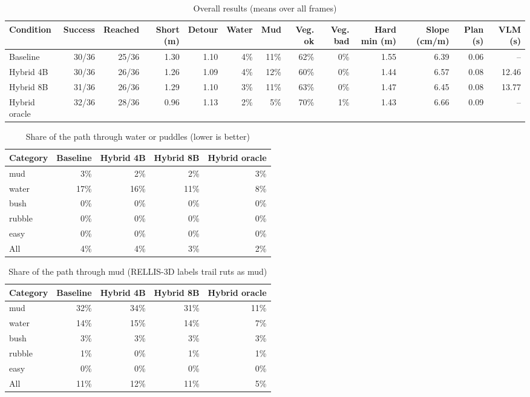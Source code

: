 \begin{table}[t]
\centering
\small
\begin{tabular}{lrrrrrrrrrrrr}
\toprule
Condition & Success & Reached & Short (m) & Detour & Water & Mud & Veg. ok & Veg. bad & Hard min (m) & Slope (cm/m) & Plan (s) & VLM (s) \\
\midrule
Baseline & 30/36 & 25/36 & 1.30 & 1.10 & 4\% & 11\% & 62\% & 0\% & 1.55 & 6.39 & 0.06 & -- \\
Hybrid 4B & 30/36 & 26/36 & 1.26 & 1.09 & 4\% & 12\% & 60\% & 0\% & 1.44 & 6.57 & 0.08 & 12.46 \\
Hybrid 8B & 31/36 & 26/36 & 1.29 & 1.10 & 3\% & 11\% & 63\% & 0\% & 1.47 & 6.45 & 0.08 & 13.77 \\
Hybrid oracle & 32/36 & 28/36 & 0.96 & 1.13 & 2\% & 5\% & 70\% & 1\% & 1.43 & 6.66 & 0.09 & -- \\
\bottomrule
\end{tabular}
\caption{Overall results (means over all frames)}
\label{tab:overall}
\end{table}

\begin{table}[t]
\centering
\small
\begin{tabular}{lrrrr}
\toprule
Category & Baseline & Hybrid 4B & Hybrid 8B & Hybrid oracle \\
\midrule
mud & 3\% & 2\% & 2\% & 3\% \\
water & 17\% & 16\% & 11\% & 8\% \\
bush & 0\% & 0\% & 0\% & 0\% \\
rubble & 0\% & 0\% & 0\% & 0\% \\
easy & 0\% & 0\% & 0\% & 0\% \\
All & 4\% & 4\% & 3\% & 2\% \\
\bottomrule
\end{tabular}
\caption{Share of the path through water or puddles (lower is better)}
\label{tab:water}
\end{table}

\begin{table}[t]
\centering
\small
\begin{tabular}{lrrrr}
\toprule
Category & Baseline & Hybrid 4B & Hybrid 8B & Hybrid oracle \\
\midrule
mud & 32\% & 34\% & 31\% & 11\% \\
water & 14\% & 15\% & 14\% & 7\% \\
bush & 3\% & 3\% & 3\% & 3\% \\
rubble & 1\% & 0\% & 1\% & 1\% \\
easy & 0\% & 0\% & 0\% & 0\% \\
All & 11\% & 12\% & 11\% & 5\% \\
\bottomrule
\end{tabular}
\caption{Share of the path through mud (RELLIS-3D labels trail ruts as mud)}
\label{tab:mud}
\end{table}

